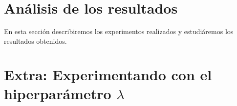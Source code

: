\documentclass[11pt,a4paper]{article}
\begin{document}
\clearpage
\section{Análisis de los resultados}
En esta sección describiremos los experimentos realizados y estudiáremos los resultados obtenidos. 
\clearpage
\section{Extra: Experimentando con el hiperparámetro $\lambda$}
\end{document}
